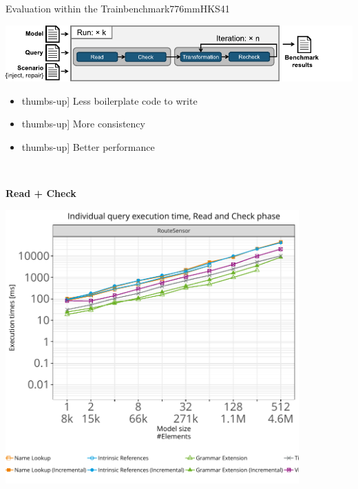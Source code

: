 \documentclass[rgb,cdgeometry=no,cd=true,cdhead=bicolor,cdfont=false,cdfoot=color,cdfont=nodin,english,paper=A0,fontsize=32pt,DIV=25,usegeometry]{tudscrposter}
\newcommand{\thumbsup}{\faIcon[regular]{thumbs-up}}
\begin{document}
\vboxsep %
\begin{contentbox}[280mm]{Evaluation within the Trainbenchmark}{776mm}{HKS41}
\begin{minipage}{210mm}
\vspace{-10mm}
\hspace{15mm}\includegraphics[width=200mm]{images/tb_process}\\[6mm]
\vspace{-6mm}
\textbf{\fontsize{36pt}{\baselineskip}\selectfont{Advantages of our Grammar Extension}}
{
  \begin{itemize}
    \item[\thumbsup] Less boilerplate code to write
    \vspace{-10mm}
    \item[\thumbsup] More consistency
    \item[\thumbsup] Better performance
  \end{itemize}
}
\end{minipage}
~\quad~
\begin{minipage}{540mm}
\begin{minipage}{190mm}
\hspace{80mm} \textbf{Read + Check}\par\vspace{3mm}
\hspace{2.35mm}\includegraphics[height=10.5cm,keepaspectratio,clip,trim=0cm 4.2cm 0cm 1.35cm]{images/repair-Read-and-Check-RouteSensor.pdf}

\end{minipage}
\end{minipage}
\end{contentbox}
\end{document}
